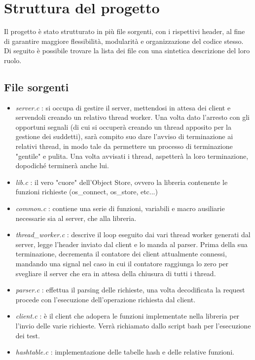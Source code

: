 \section{Struttura del progetto}
\begin{flushleft}

Il progetto è stato strutturato in più file sorgenti, con i rispettivi header, al fine di garantire maggiore flessibilità, modularità e organizzazione del codice stesso. Di seguito è possibile trovare la lista dei file con una sintetica descrizione del loro ruolo.

\subsection{File sorgenti}
\begin{itemize}
	\item \emph{server.c} : si occupa di gestire il server, mettendosi in attesa dei client e servendoli creando un relativo thread worker. Una volta
	dato l'arresto con gli opportuni segnali (di cui si occuperà creando un thread apposito per la gestione dei suddetti), sarà compito suo dare l'avviso di terminazione ai relativi thread, in modo tale da permettere un processo di terminazione "gentile" e pulita. Una volta avvisati i thread, aspetterà la loro terminazione, dopodiché terminerà anche lui.
	
	\item \emph{lib.c} : il vero "cuore" dell'Object Store, ovvero la libreria contenente le funzioni richieste (os\_connect, os\_store, etc...)
	
	\item \emph{common.c} : contiene una serie di funzioni, variabili e macro ausiliarie necessarie sia al server, che alla libreria.
	
	\item \emph{thread\_worker.c} : descrive il loop eseguito dai vari thread worker generati dal server, legge l'header inviato dal client e lo manda al parser. Prima della sua terminazione, decrementa il contatore dei client attualmente connessi, mandando una signal nel caso in cui il contatore raggiunga lo zero per svegliare il server che era in attesa della chiusura di tutti i thread.
	
	\item \emph{parser.c} : effettua il parsing delle richieste, una volta decodificata la request procede con l'esecuzione dell'operazione richiesta dal client.
	
	\item \emph{client.c} : è il client che adopera le funzioni implementate nella libreria per l'invio delle varie richieste. Verrà richiamato dallo script bash per l'esecuzione dei test.
	
	\item \emph{hashtable.c} : implementazione delle tabelle hash e delle relative funzioni.

\end{itemize}


\end{flushleft}

